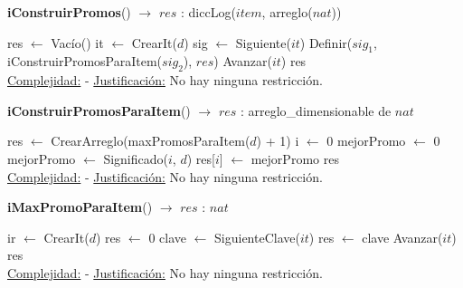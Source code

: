 \begin{Algoritmos}
    \begin{algorithm}
    \caption{\textbf{iConstruirPromos}() $\to$ $res$ : diccLog($item$, arreglo($nat$))}
    \begin{algorithmic}
        \State res $\gets$ Vacío()
        \State it $\gets$ CrearIt($d$)
            \State sig $\gets$ Siguiente($it$)
            \State Definir($sig_1$, iConstruirPromosParaItem($sig_2$), $res$)
            \State Avanzar($it$)
        \EndWhile
        \State \Return res
        \\
        \Statex \underline{Complejidad:} -
        \Statex \underline{Justificación:} No hay ninguna restricción.
    \end{algorithmic}
    \end{algorithm}

    \begin{algorithm}
    \caption{\textbf{iConstruirPromosParaItem}() $\to$ $res$ : arreglo\_dimensionable de $nat$}
    \begin{algorithmic}
        \State res $\gets$ CrearArreglo(maxPromosParaItem($d$) + 1)  
        \State i $\gets$ 0
        \State mejorPromo $\gets$ 0
                \State mejorPromo $\gets$ Significado($i$, $d$)
            \EndIf
            \State res[$i$] $\gets$ mejorPromo
        \EndWhile
        \State \Return res
        \\
        \Statex \underline{Complejidad:} -
        \Statex \underline{Justificación:} No hay ninguna restricción.
    \end{algorithmic}
    \end{algorithm}

    \begin{algorithm}
    \caption{\textbf{iMaxPromoParaItem}() $\to$ $res$ : $nat$}
    \begin{algorithmic}
        \State ir $\gets$ CrearIt($d$)
        \State res $\gets$ 0
            \State clave $\gets$ SiguienteClave($it$)
                \State res $\gets$ clave
            \EndIf
            \State Avanzar($it$)
        \EndWhile
        \State \Return res
        \\
        \Statex \underline{Complejidad:} -
        \Statex \underline{Justificación:} No hay ninguna restricción.
    \end{algorithmic}
    \end{algorithm}


\end{Algoritmos}
